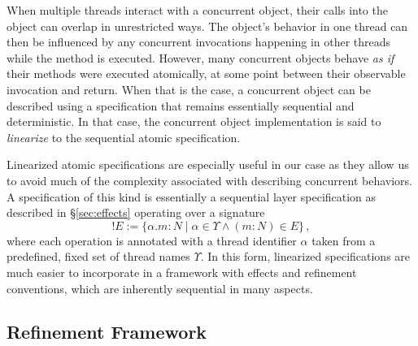 When multiple threads interact with a concurrent object,
their calls into the object can overlap in unrestricted ways.
The object's behavior in one thread can then be
influenced by any concurrent invocations happening in other threads
while the method is executed.
However,
many concurrent objects behave \emph{as if}
their methods were executed atomically,
at some point between their observable invocation and return.
When that is the case,
a concurrent object can be described
using a specification that remains
essentially sequential and deterministic.
In that case,
the concurrent object implementation
is said to \emph{linearize} to
the sequential atomic specification.

Linearized atomic specifications are
especially useful in our case
as they allow us to avoid much of the complexity associated with
describing concurrent behaviors.
A specification of this kind is essentially
a sequential layer specification as described in \S\ref{sec:effects}
operating over a signature
\newcommand\parr{!}
\[
  \parr E := \{ \alpha . m \mathbin: N \mid
           \alpha \in \Upsilon \wedge
           (m \mathbin: N) \in E \}
  \,,
\]
where each operation is annotated with
a thread identifier $\alpha$
taken from a predefined, fixed set of thread names $\Upsilon$.
In this form,
linearized specifications are much easier to
incorporate in a framework with effects and refinement conventions,
which are inherently sequential in many aspects.

\subsection{Refinement Framework}

